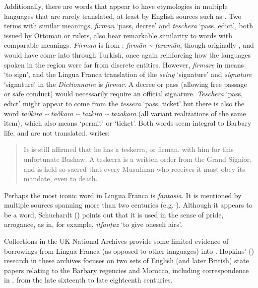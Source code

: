 \documentclass[output=paper]{langsci/langscibook}
\begin{document}
	Additionally, there are words that appear to have etymologies in multiple languages that are rarely translated, at least by English sources such as \citet{Tully1819}. Two terms with similar meanings, \textit{firman} ‘pass, decree’ and \textit{teschera} ‘pass, edict’, both issued by Ottoman or  rulers, also bear remarkable similarity to  words with comparable meanings. \textit{Firman} is from : \textit{firmān {\textasciitilde} faramān}, though originally , and would have come into  through  {Turkish}, once again reinforcing how the languages spoken in the region were far from discrete entities. However, \textit{firmare} in  means `to sign', and the Lingua Franca translation of the  \textit{seing} ‘signature’ and \textit{signature} ‘signature’ in the \textit{Dictionnaire} is \textit{firmar}. A decree or pass (allowing free passage or safe conduct) would necessarily require an official signature. \textit{Teschera} ‘pass, edict’ might appear to come from the  \textit{tessera} ‘pass, ticket’ but there is also the  word \textit{taðkira {\textasciitilde} taðkara {\textasciitilde} tazkira {\textasciitilde} tazakara} (all variant realizations of the same item), which also means ‘permit’ or ‘ticket’. Both words seem integral to Barbary life, and are not translated. \citet[258]{Tully1819} writes: 
	
	\begin{quote}
		It is still affirmed that he has a teskerra, or firman, with him for this unfortunate Bashaw. A teskerra is a written order from the Grand Signior, and is held so sacred that every Musulman who receives it must obey its mandate, even to death.
	\end{quote}
	
	Perhaps the most iconic word in Lingua Franca is \textit{fantasia}. It is mentioned by multiple sources spanning more than two centuries (e.g. \citealt{Haedo1612,Broughton1839}). Although it appears to be a  word, Schuchardt (\citeyear[71]{Schuchardt1909}) points out that it is used in the  sense of pride, arrogance, as in, for example,  \textit{itfanṭaz} ‘to give oneself airs’.
	
	Collections in the UK National Archives provide some limited evidence of borrowings from Lingua Franca (as opposed to other  languages) into . Hopkins' (\citeyear{Hopkins1982}) research in these archives focuses on two sets of English (and later British) state papers relating to the Barbary regencies and Morocco, including correspondence in , from the late sixteenth to late eighteenth centuries. 
	
\end{document}
